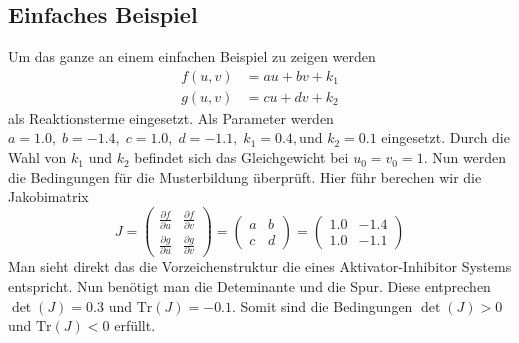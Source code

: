 \subsection{Einfaches Beispiel}
Um das ganze an einem einfachen Beispiel zu zeigen werden
\begin{align}
f(u, v) &= a u + b v + k_1 \\
g(u, v) &= c u + d v + k_2
\label{reaktdiff:equ:ownreakterm}
\end{align}
als Reaktionsterme eingesetzt.
Als Parameter werden \( a = 1.0,\; b = -1.4,\; c = 1.0,\; d = -1.1,\; k_1 = 0.4,\text{und }k_2 = 0.1 \) eingesetzt.
Durch die Wahl von \(k_1\) und \(k_2\) befindet sich das Gleichgewicht bei \(u_0 = v_0 = 1\).
Nun werden die Bedingungen für die Musterbildung überprüft.
Hier führ berechen wir die Jakobimatrix
\begin{equation*}
        J =
        \begin{pmatrix}
        \frac{\partial f}{\partial u} & \frac{\partial f}{\partial v} \\
        \frac{\partial g}{\partial u} & \frac{\partial g}{\partial v}
        \end{pmatrix}
        =
        \begin{pmatrix}
        a & b \\
        c & d
        \end{pmatrix}
        =
        \begin{pmatrix}
        1.0 & -1.4 \\
        1.0 & -1.1
        \end{pmatrix}
\end{equation*}
Man sieht direkt das die Vorzeichenstruktur die eines Aktivator-Inhibitor Systems entspricht.
Nun benötigt man die Deteminante und die Spur.
Diese entprechen \(\det(J) = 0.3\) und \(\text{Tr}(J) = -0.1\).
Somit sind die Bedingungen \(\det(J) > 0\) und \(\text{Tr}(J) <0\) erfüllt.

